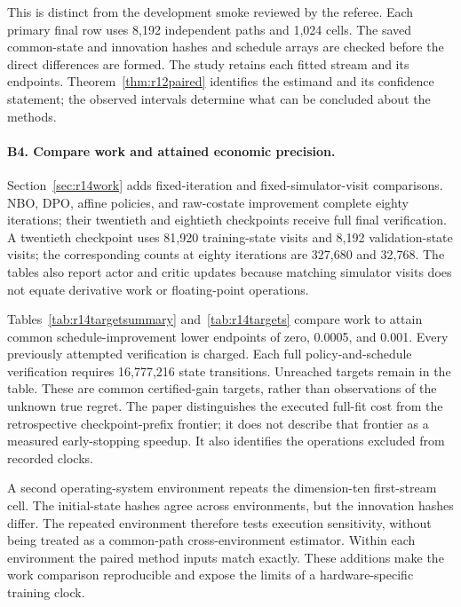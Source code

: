 This is distinct from the development smoke reviewed by the referee. Each primary final row uses 8,192 independent paths and 1,024 cells. The saved common-state and innovation hashes and schedule arrays are checked before the direct differences are formed. The study retains each fitted stream and its endpoints. Theorem~\ref{thm:r12paired} identifies the estimand and its confidence statement; the observed intervals determine what can be concluded about the methods.

\paragraph*{B4. Compare work and attained economic precision.}
Section~\ref{sec:r14work} adds fixed-iteration and fixed-simulator-visit comparisons. NBO, DPO, affine policies, and raw-costate improvement complete eighty iterations; their twentieth and eightieth checkpoints receive full final verification. A twentieth checkpoint uses 81,920 training-state visits and 8,192 validation-state visits; the corresponding counts at eighty iterations are 327,680 and 32,768. The tables also report actor and critic updates because matching simulator visits does not equate derivative work or floating-point operations.

Tables~\ref{tab:r14targetsummary} and~\ref{tab:r14targets} compare work to attain common schedule-improvement lower endpoints of zero, 0.0005, and 0.001. Every previously attempted verification is charged. Each full policy-and-schedule verification requires 16,777,216 state transitions. Unreached targets remain in the table. These are common certified-gain targets, rather than observations of the unknown true regret. The paper distinguishes the executed full-fit cost from the retrospective checkpoint-prefix frontier; it does not describe that frontier as a measured early-stopping speedup. It also identifies the operations excluded from recorded clocks.

A second operating-system environment repeats the dimension-ten first-stream cell. The initial-state hashes agree across environments, but the innovation hashes differ. The repeated environment therefore tests execution sensitivity, without being treated as a common-path cross-environment estimator. Within each environment the paired method inputs match exactly. These additions make the work comparison reproducible and expose the limits of a hardware-specific training clock.

